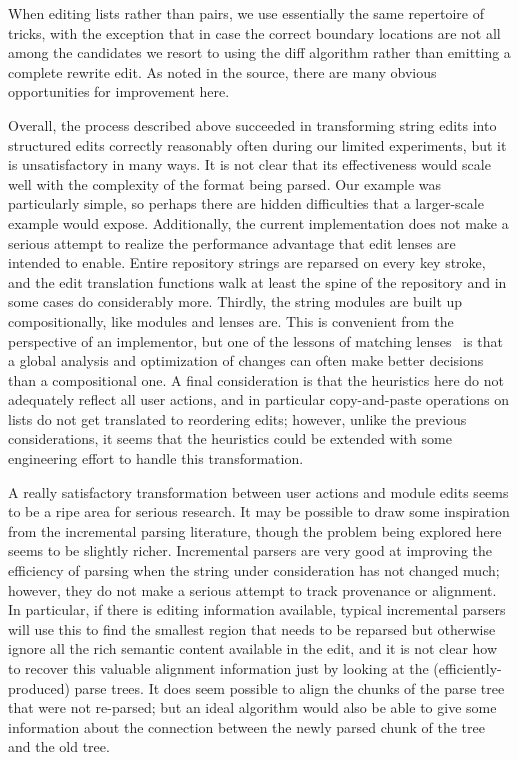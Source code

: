 When editing lists rather than pairs, we use essentially the same repertoire
of tricks, with the exception that in case the correct boundary locations
are not all among the candidates we resort to using the diff algorithm
rather than emitting a complete rewrite edit. As noted in the source, there
are many obvious opportunities for improvement here.

Overall, the process described above succeeded in transforming string edits
into structured edits correctly reasonably often during our limited
experiments, but it is unsatisfactory in many ways. It is not clear that its
effectiveness would scale well with the complexity of the format being
parsed. Our example was particularly simple, so perhaps there are hidden
difficulties that a larger-scale example would expose. Additionally, the
current implementation does not make a serious attempt to realize the
performance advantage that edit lenses are intended to enable. Entire
repository strings are reparsed on every key stroke, and the edit
translation functions walk at least the spine of the repository and in some
cases do considerably more. Thirdly, the string modules are built up
compositionally, like modules and lenses are. This is convenient from the
perspective of an implementor, but one of the lessons of matching
lenses~\cite{Matching10} is that a global analysis and optimization of
changes can often make better decisions than a compositional one. A final
consideration is that the heuristics here do not adequately reflect all user
actions, and in particular copy-and-paste operations on lists do not get
translated to reordering edits; however, unlike the previous considerations,
it seems that the heuristics could be extended with some engineering effort
to handle this transformation.

A really satisfactory transformation between user actions and module edits
seems to be a ripe area for serious research. It may be possible to draw
some inspiration from the incremental parsing literature,
though the problem being explored here seems to be slightly richer.
Incremental parsers are very good at improving the efficiency of parsing
when the string under consideration has not changed much; however, they do
not make a serious attempt to track provenance or alignment. In particular,
if there is editing information available, typical incremental parsers will
use this to find the smallest region that needs to be reparsed but otherwise
ignore all the rich semantic content available in the edit, and it is not
clear how to recover this valuable alignment information just by looking at
the (efficiently-produced) parse trees. It does seem possible to align the
chunks of the parse tree that were not re-parsed; but an ideal algorithm
would also be able to give some information about the connection between the
newly parsed chunk of the tree and the old tree.

